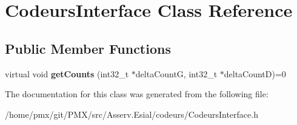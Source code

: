 \hypertarget{classCodeursInterface}{}\section{Codeurs\+Interface Class Reference}
\label{classCodeursInterface}
\subsection*{Public Member Functions}
\begin{DoxyCompactItemize}
\item 
\mbox{\label{classCodeursInterface_a44dc11522514fc3f1e50aecee176bb1d}} 
virtual void {\bfseries get\+Counts} (int32\+\_\+t $\ast$delta\+CountG, int32\+\_\+t $\ast$delta\+CountD)=0
\end{DoxyCompactItemize}


The documentation for this class was generated from the following file\+:\begin{DoxyCompactItemize}
\item 
/home/pmx/git/\+P\+M\+X/src/\+Asserv.\+Esial/codeurs/Codeurs\+Interface.\+h\end{DoxyCompactItemize}
